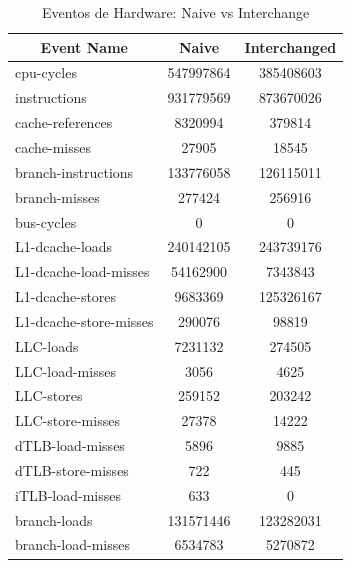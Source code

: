 \documentclass[conference,compsoc]{IEEEtran}
\begin{document}
 \begin{table}[h!]
\centering
\begin{tabular}{|l|c|c|}
\hline
\multicolumn{1}{|c|}{\textbf{Event Name}} & \textbf{Naive} & \textbf{Interchanged} \\ \hline
cpu-cycles                                & 547997864      & 385408603             \\ \hline
instructions                              & 931779569      & 873670026             \\ \hline
cache-references                          & 8320994        & 379814                \\ \hline
cache-misses                              & 27905          & 18545                 \\ \hline
branch-instructions                       & 133776058      & 126115011             \\ \hline
branch-misses                             & 277424         & 256916                \\ \hline
bus-cycles                                & 0              & 0                     \\ \hline
L1-dcache-loads                           & 240142105      & 243739176             \\ \hline
L1-dcache-load-misses                     & 54162900       & 7343843               \\ \hline
L1-dcache-stores                          & 9683369        & 125326167             \\ \hline
L1-dcache-store-misses                    & 290076         & 98819                 \\ \hline
LLC-loads                                 & 7231132        & 274505                \\ \hline
LLC-load-misses                           & 3056           & 4625                  \\ \hline
LLC-stores                                & 259152         & 203242                \\ \hline
LLC-store-misses                          & 27378          & 14222                 \\ \hline
dTLB-load-misses                          & 5896           & 9885                  \\ \hline
dTLB-store-misses                         & 722            & 445                   \\ \hline
iTLB-load-misses                          & 633            & 0                     \\ \hline
branch-loads                              & 131571446      & 123282031             \\ \hline
branch-load-misses                        & 6534783        & 5270872               \\ \hline
\end{tabular}
\caption{Eventos de Hardware: Naive vs Interchange}
\label{table:contadores}
\end{table}
\end{document}
